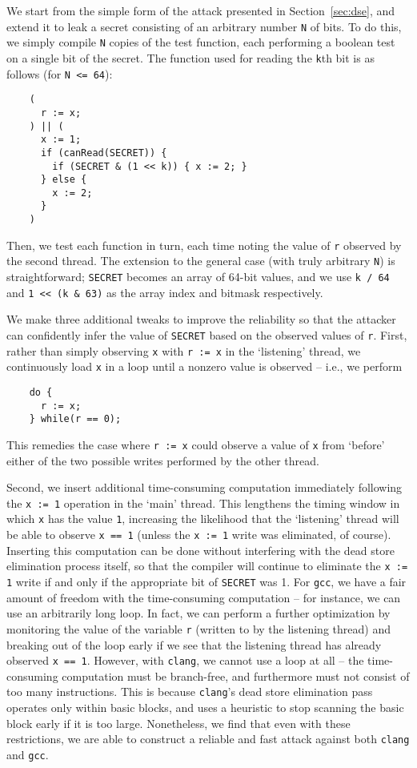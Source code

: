 We start from the simple form of the attack presented in
Section~\ref{sec:dse}, and extend it to leak a secret consisting of an
arbitrary number \verb|N| of bits.
To do this, we simply compile \verb|N| copies of the test function,
each performing a boolean test on a single bit of the secret.
The function used for reading the \verb|k|th bit is as follows (for
\verb|N <= 64|):
\begin{verbatim}
    (
      r := x;
    ) || (
      x := 1;
      if (canRead(SECRET)) {
        if (SECRET & (1 << k)) { x := 2; }
      } else {
        x := 2;
      }
    )
\end{verbatim}
Then, we test each function in turn, each time noting the value of \verb|r|
observed by the second thread.
The extension to the general case (with truly arbitrary \verb|N|) is
straightforward; \verb|SECRET| becomes an array of 64-bit values, and we use
\verb|k / 64| and \verb|1 << (k & 63)| as the array index and bitmask
respectively.

We make three additional tweaks to improve the reliability so that the attacker
can confidently infer the value of \verb|SECRET| based on the observed values
of \verb|r|.
First, rather than simply observing \verb|x| with \verb|r := x| in the
`listening' thread, we continuously load \verb|x| in a loop until a
nonzero value is observed -- i.e., we perform
\begin{verbatim}
    do {
      r := x;
    } while(r == 0);
\end{verbatim}
This remedies the case where \verb|r := x| could observe a value of \verb|x|
from `before' either of the two possible writes performed by the other thread.

Second, we insert additional time-consuming computation immediately following
the \verb|x := 1| operation in the `main' thread.
This lengthens the timing window in which \verb|x| has the value \verb|1|,
increasing the likelihood that the `listening' thread will be able to observe
\verb|x == 1| (unless the \verb|x := 1| write was eliminated, of course).
Inserting this computation can be done without interfering with the dead store
elimination process itself, so that the compiler will continue to eliminate
the \verb|x := 1| write if and only if the appropriate bit of \verb|SECRET|
was 1.
For \verb|gcc|, we have a fair amount of freedom with the time-consuming
computation -- for instance, we can use an arbitrarily long loop.
In fact, we can perform a further optimization by monitoring the value of the
variable \verb|r| (written to by the listening thread) and breaking out of the
loop early if we see that the listening thread has already observed
\verb|x == 1|.
However, with \verb|clang|, we cannot use a loop at all -- the time-consuming
computation must be branch-free, and furthermore must not consist of too many
instructions.
This is because \verb|clang|'s dead store elimination pass operates only
within basic blocks, and uses a heuristic to stop scanning the basic block
early if it is too large.
Nonetheless, we find that even with these restrictions, we are able to
construct a reliable and fast attack against both \verb|clang| and \verb|gcc|.


